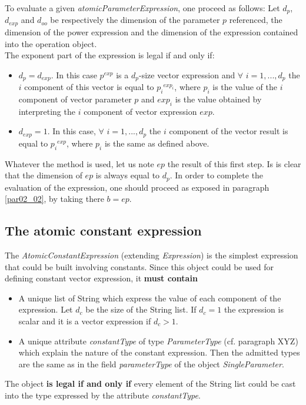 \documentclass[a4paper,11pt] {article}
\begin{document}
To evaluate a given {\it atomicParameterExpression}, one proceed as follows: 
Let $d_p$, $d_{exp}$ and $d_{oo}$ be respectively the dimension of the parameter $p$ referenced, the dimension of the power expression and the dimension of the expression contained into the operation object.\\
The exponent part of the expression is legal if and only if:
\begin{itemize}
\item $d_p=d_{exp}$. In this case $p^{exp}$ is a $d_p$-size vector expression and $\forall$ $i=1,...,d_p$ the $i$ component of this vector is equal to ${p_i}^{exp_i}$, where $p_i$ is the value of the $i$ component of vector parameter $p$ and $exp_i$ is the value obtained by interpreting the $i$ component of vector expression $exp$.
\item $d_{exp}=1$. In this case, $\forall$ $i=1,...,d_p$ the $i$ component of the vector result is equal to ${p_i}^{exp}$, where $p_i$ is the same as defined above.\\
\end{itemize} 

Whatever the method is used, let us note $ep$ the result of this first step. Is is clear that the dimension of $ep$ 
is always equal to $d_p$. In order to complete the evaluation of the expression, one should proceed as exposed in paragraph \ref{par02_02}, by taking there $b=ep$.

\subsection{The atomic constant expression}\label{par02_03}
The {\it AtomicConstantExpression} (extending {\it Expression}) is the simplest expression that could be built involving constants. Since this object could be used for defining constant vector expression, it {\bf must contain} 
\begin{itemize}
\item A unique list of String which express the value of each component of the expression. Let $d_c$ be the size of the String list. If $d_c=1$ the expression is scalar and it is a vector expression if $d_c>1$. 
\item A unique attribute {\it constantType} of type {\it ParameterType} (cf. paragraph XYZ) which explain the nature of the constant expression. Then the admitted types are the same as in the field {\it parameterType} of the object {\it SingleParameter}. 
\end{itemize}
The object {\bf is legal if and only if} every element of the String list could be cast into the type expressed by the attribute {\it constantType}.\\
\end{document}
